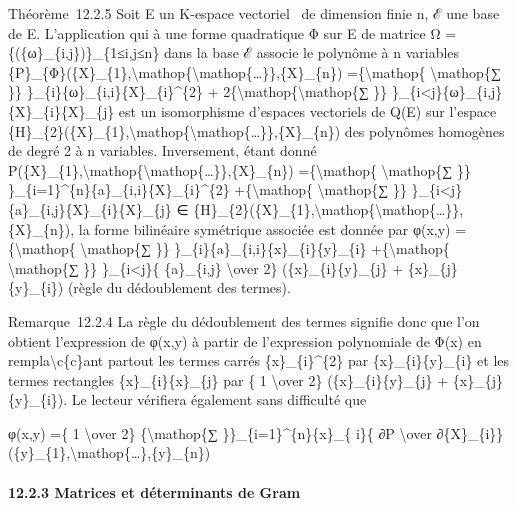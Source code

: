 \documentclass[]{article}
\begin{document}
Théorème~12.2.5 Soit E un K-espace vectoriel ~de dimension finie n, ℰ
une base de E. L'application qui à une forme quadratique Φ sur E de
matrice Ω = \{(\{ω\}\_\{i,j\})\}\_\{1≤i,j≤n\} dans la base ℰ associe le
polynôme à n variables
\{P\}\_\{Φ\}(\{X\}\_\{1\},\textbackslash{}mathop\{\textbackslash{}mathop\{\ldots{}\}\},\{X\}\_\{n\})
=\{\textbackslash{}mathop\{ \textbackslash{}mathop\{∑ \}\}
\}\_\{i\}\{ω\}\_\{i,i\}\{X\}\_\{i\}\^{}\{2\} +
2\{\textbackslash{}mathop\{\textbackslash{}mathop\{∑ \}\}
\}\_\{i\textless{}j\}\{ω\}\_\{i,j\}\{X\}\_\{i\}\{X\}\_\{j\} est un
isomorphisme d'espaces vectoriels de Q(E) sur l'espace
\{H\}\_\{2\}(\{X\}\_\{1\},\textbackslash{}mathop\{\textbackslash{}mathop\{\ldots{}\}\},\{X\}\_\{n\})
des polynômes homogènes de degré 2 à n variables. Inversement, étant
donné
P(\{X\}\_\{1\},\textbackslash{}mathop\{\textbackslash{}mathop\{\ldots{}\}\},\{X\}\_\{n\})
=\{\textbackslash{}mathop\{ \textbackslash{}mathop\{∑ \}\}
\}\_\{i=1\}\^{}\{n\}\{a\}\_\{i,i\}\{X\}\_\{i\}\^{}\{2\}
+\{\textbackslash{}mathop\{ \textbackslash{}mathop\{∑ \}\}
\}\_\{i\textless{}j\}\{a\}\_\{i,j\}\{X\}\_\{i\}\{X\}\_\{j\} ∈
\{H\}\_\{2\}(\{X\}\_\{1\},\textbackslash{}mathop\{\textbackslash{}mathop\{\ldots{}\}\},\{X\}\_\{n\}),
la forme bilinéaire symétrique associée est donnée par φ(x,y)
=\{\textbackslash{}mathop\{ \textbackslash{}mathop\{∑ \}\}
\}\_\{i\}\{a\}\_\{i,i\}\{x\}\_\{i\}\{y\}\_\{i\}
+\{\textbackslash{}mathop\{ \textbackslash{}mathop\{∑ \}\}
\}\_\{i\textless{}j\}\{ \{a\}\_\{i,j\} \textbackslash{}over 2\}
(\{x\}\_\{i\}\{y\}\_\{j\} + \{x\}\_\{j\}\{y\}\_\{i\}) (règle du
dédoublement des termes).

Remarque~12.2.4 La règle du dédoublement des termes signifie donc que
l'on obtient l'expression de φ(x,y) à partir de l'expression polynomiale
de Φ(x) en rempla\textbackslash{}c\{c\}ant partout les termes carrés
\{x\}\_\{i\}\^{}\{2\} par \{x\}\_\{i\}\{y\}\_\{i\} et les termes
rectangles \{x\}\_\{i\}\{x\}\_\{j\} par \{ 1 \textbackslash{}over 2\}
(\{x\}\_\{i\}\{y\}\_\{j\} + \{x\}\_\{j\}\{y\}\_\{i\}). Le lecteur
vérifiera également sans difficulté que

φ(x,y) =\{ 1 \textbackslash{}over 2\} \{\textbackslash{}mathop\{∑
\}\}\_\{i=1\}\^{}\{n\}\{x\}\_\{ i\}\{ ∂P \textbackslash{}over
∂\{X\}\_\{i\}\}
(\{y\}\_\{1\},\textbackslash{}mathop\{\ldots{}\},\{y\}\_\{n\})

\paragraph{12.2.3 Matrices et déterminants de Gram}
\end{document}
